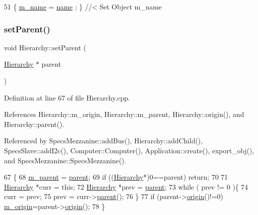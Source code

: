 \begin{DoxyCode}
51 \{ \hyperlink{classObject_a8b83c95c705d2c3ba0d081fe1710f48d}{m\_name}  = \hyperlink{classObject_a300f4c05dd468c7bb8b3c968868443c1}{name}  ; \} \textcolor{comment}{//< Set Object m\_name}
\end{DoxyCode}
\mbox{\label{classHierarchy_a585ad1aeec16077a0e532ab8b4fc557b}} 
\subsubsection{\texorpdfstring{set\+Parent()}{setParent()}}
{\footnotesize\ttfamily void Hierarchy\+::set\+Parent (\begin{DoxyParamCaption}\item[{\hyperlink{classHierarchy}{Hierarchy} $\ast$}]{parent }\end{DoxyParamCaption})\hspace{0.3cm}{\ttfamily [inherited]}}



Definition at line 67 of file Hierarchy.\+cpp.



References Hierarchy\+::m\+\_\+origin, Hierarchy\+::m\+\_\+parent, Hierarchy\+::origin(), and Hierarchy\+::parent().



Referenced by Specs\+Mezzanine\+::add\+Bus(), Hierarchy\+::add\+Child(), Specs\+Slave\+::add\+I2c(), Computer\+::\+Computer(), Application\+::create(), export\+\_\+obj(), and Specs\+Mezzanine\+::\+Specs\+Mezzanine().


\begin{DoxyCode}
67                                               \{
68   \hyperlink{classHierarchy_a5814bb280d4e8539ab25ab6cbfb9cc4f}{m\_parent} = \hyperlink{classHierarchy_a1c7bec8257e717f9c1465e06ebf845fc}{parent};
69   \textcolor{keywordflow}{if} ((\hyperlink{classHierarchy}{Hierarchy}*)0==parent) \textcolor{keywordflow}{return};
70 
71   \hyperlink{classHierarchy}{Hierarchy} *curr = \textcolor{keyword}{this};
72   \hyperlink{classHierarchy}{Hierarchy} *prev = \hyperlink{classHierarchy_a1c7bec8257e717f9c1465e06ebf845fc}{parent};
73   \textcolor{keywordflow}{while} ( prev != 0 )\{
74     curr = prev;
75     prev = curr->\hyperlink{classHierarchy_a1c7bec8257e717f9c1465e06ebf845fc}{parent}();
76   \}
77   \textcolor{keywordflow}{if} (parent->\hyperlink{classHierarchy_aee461dc930ce3871636ff87f075b1b83}{origin}()!=0) \hyperlink{classHierarchy_a16c73e557d3a7c156ffb5dc4102d148e}{m\_origin}=parent->\hyperlink{classHierarchy_aee461dc930ce3871636ff87f075b1b83}{origin}();
78 \}
\end{DoxyCode}
\mbox{\label{classObject_a89557dbbad5bcaa02652f5d7fa35d20f}} 
